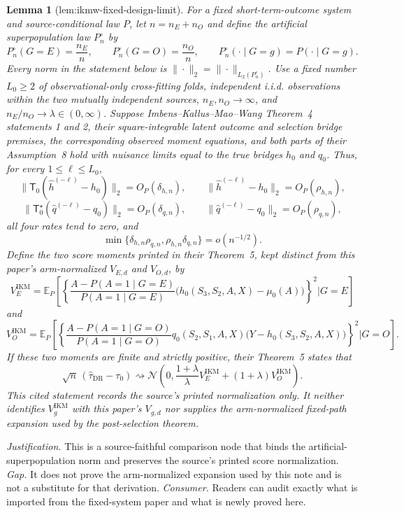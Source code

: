 \documentclass{article}
\newtheorem{lemma}{Lemma}
\begin{document}
\begin{lemma}[lem:ikmw-fixed-design-limit]\label{lem:ikmw-fixed-design-limit}
For a fixed short-term-outcome system and source-conditional law \(P\), let \(n=n_E+n_O\) and define the artificial superpopulation law \(P_n^{\circ}\) by
\[
 P_n^{\circ}(G=E)=\frac{n_E}{n},
 \qquad
 P_n^{\circ}(G=O)=\frac{n_O}{n},
 \qquad
 P_n^{\circ}(\cdot\mid G=g)=P(\cdot\mid G=g).
\]
Every norm in the statement below is \(\|\cdot\|_2=\|\cdot\|_{L_2(P_n^{\circ})}\).  Use a fixed number \(L_0\ge2\) of observational-only cross-fitting folds, independent i.i.d. observations within the two mutually independent sources, \(n_E,n_O\to\infty\), and \(n_E/n_O\to\lambda\in(0,\infty)\).  Suppose Imbens--Kallus--Mao--Wang Theorem~4 statements 1 and 2, their square-integrable latent outcome and selection bridge premises, the corresponding observed moment equations, and both parts of their Assumption~8 hold with nuisance limits equal to the true bridges \(h_0\) and \(q_0\).  Thus, for every \(1\le\ell\le L_0\),
\[
 \|\mathsf T_0(\widehat h^{(-\ell)}-h_0)\|_2=O_P(\delta_{h,n}),
 \qquad
 \|\widehat h^{(-\ell)}-h_0\|_2=O_P(\rho_{h,n}),
\]
\[
 \|\mathsf T_0^\star(\widehat q^{(-\ell)}-q_0)\|_2=O_P(\delta_{q,n}),
 \qquad
 \|\widehat q^{(-\ell)}-q_0\|_2=O_P(\rho_{q,n}),
\]
all four rates tend to zero, and
\[
 \min\{\delta_{h,n}\rho_{q,n},\rho_{h,n}\delta_{q,n}\}
 =o(n^{-1/2}).
\]
Define the two score moments printed in their Theorem~5, kept distinct from this paper's arm-normalized \(V_{E,d}\) and \(V_{O,d}\), by
\[
 V_E^{\mathrm{IKM}}
 =\mathbb E_P\!\left[
 \left\{\frac{A-P(A=1\mid G=E)}{P(A=1\mid G=E)}
 \bigl(h_0(S_3,S_2,A,X)-\mu_0(A)\bigr)\right\}^2
 \mathrel{\Big|}G=E\right]
\]
and
\[
 V_O^{\mathrm{IKM}}
 =\mathbb E_P\!\left[
 \left\{\frac{A-P(A=1\mid G=O)}{P(A=1\mid G=O)}
 q_0(S_2,S_1,A,X)
 \bigl(Y-h_0(S_3,S_2,A,X)\bigr)\right\}^2
 \mathrel{\Big|}G=O\right].
\]
If these two moments are finite and strictly positive, their Theorem~5 states that
\[
 \sqrt n\,(\widehat\tau_{\mathrm{DR}}-\tau_0)
 \rightsquigarrow
 \mathcal N\!\left(0,
 \frac{1+\lambda}{\lambda}V_E^{\mathrm{IKM}}
 +(1+\lambda)V_O^{\mathrm{IKM}}\right).
\]
This cited statement records the source's printed normalization only.  It neither identifies \(V_g^{\mathrm{IKM}}\) with this paper's \(V_{g,d}\) nor supplies the arm-normalized fixed-path expansion used by the post-selection theorem.
\end{lemma}
\par\smallskip\noindent \textit{Justification.} This is a source-faithful comparison node that binds the artificial-superpopulation norm and preserves the source's printed score normalization. \textit{Gap.} It does not prove the arm-normalized expansion used by this note and is not a substitute for that derivation. \textit{Consumer.} Readers can audit exactly what is imported from the fixed-system paper and what is newly proved here.
\end{document}

